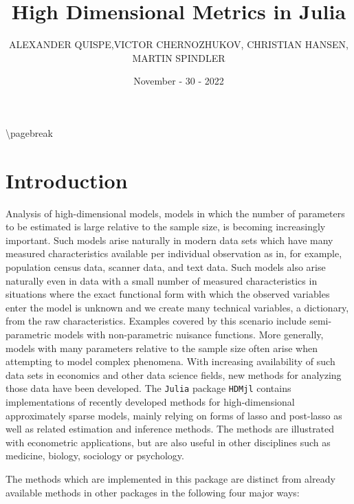 \documentclass[12pt,a4paper]{article}
\title{ High Dimensional Metrics in Julia }
\author{ ALEXANDER QUISPE,VICTOR CHERNOZHUKOV, CHRISTIAN HANSEN, MARTIN SPINDLER }
\date{ November - 30 - 2022 }
\begin{document}
\maketitle

{\textbackslash}pagebreak 

\section{Introduction}
Analysis of high-dimensional models, models in which the number of parameters to be estimated is large relative to the sample size, is becoming increasingly important. Such models arise naturally in modern data sets which have many measured characteristics available per individual observation as in, for example, population census data, scanner data, and text data. Such models also arise naturally even in data with a small number of measured characteristics in situations where the exact functional form with which the observed variables enter the model is unknown and we create many technical variables, a dictionary, from the raw characteristics. Examples covered by this scenario include semi-parametric models with non-parametric nuisance functions. More generally, models with many parameters relative to the sample size often arise when attempting to model complex phenomena. With increasing availability of such data sets in economics and other data science fields, new methods for analyzing those data have been developed. The \texttt{Julia} package \texttt{HDMjl} contains implementations of recently developed methods for high-dimensional approximately sparse models, mainly relying on forms of lasso and post-lasso as well as related estimation and inference methods. The methods are illustrated with econometric applications, but are also useful in other disciplines such as medicine, biology, sociology or psychology.

The methods which are implemented in this package are distinct from already available methods in other packages in the following four major ways:
\end{document}
